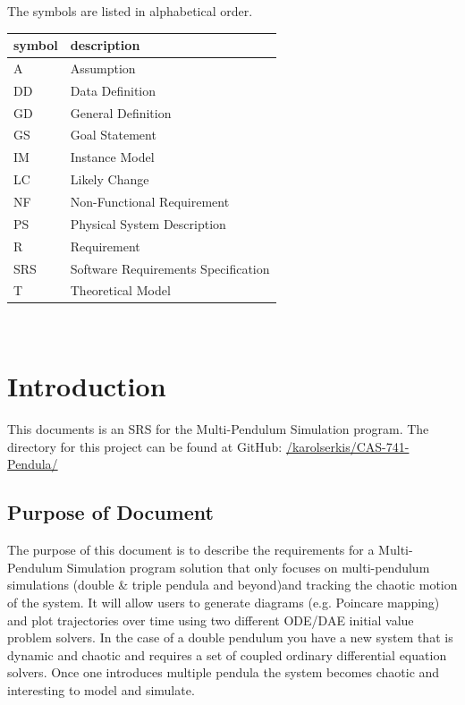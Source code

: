 \documentclass[12pt]{article}
\newcommand{\progname}{Multi-Pendulum Simulation }
\begin{document}
The symbols are listed in alphabetical order.\\

\renewcommand{\arraystretch}{1.2}
\begin{tabular}{l l} 
  \toprule		
  \textbf{symbol} & \textbf{description}\\
  \midrule 
  A & Assumption\\
  DD & Data Definition\\
  GD & General Definition\\
  GS & Goal Statement\\
  IM & Instance Model\\
  LC & Likely Change\\
  NF & Non-Functional Requirement\\
  PS & Physical System Description\\
  R & Requirement\\
  SRS & Software Requirements Specification\\
  T & Theoretical Model\\
  \bottomrule
\end{tabular}\\

\newpage


\setcounter{secnumdepth}{3}

\section{Introduction}

This documents is an SRS for the \progname program. The directory for this
project can
be found at GitHub:
\href{https://github.com/karolserkis/CAS-741-Pendula/}{/karolserkis/CAS-741-Pendula/}

\subsection{Purpose of Document}
The purpose of this document is to describe the requirements for a
\progname program solution that
only focuses on multi-pendulum simulations (double \& triple pendula and beyond)and tracking the chaotic
motion of the system. It will allow users to generate diagrams (e.g. Poincare
mapping)
and plot trajectories over time using two different ODE/DAE initial value
problem solvers. In the case of
a double pendulum you have a new system that is dynamic and chaotic and
requires a set of coupled ordinary differential equation solvers. Once one
introduces
multiple
pendula the system becomes chaotic and interesting to model and simulate. 
\end{document}
